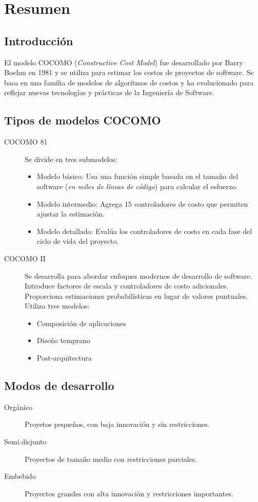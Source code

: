 \section*{Resumen}

\subsection*{Introducci\'on}
\noindent El modelo COCOMO (\textit{Constructive Cost Model}) fue desarrollado por Barry Boehm en 1981 y se utiliza para estimar los costos
de proyectos de software. Se basa en una familia de modelos de algoritmos de costos y ha evolucionado para reflejar nuevas tecnolog\'ias y
pr\'acticas de la Ingenier\'ia de Software.

\subsection*{Tipos de modelos COCOMO}
\begin{description}
  \item[COCOMO 81] Se divide en tres submodelos:
  \begin{itemize}
    \item Modelo b\'asico: Usa una funci\'on simple basada en el tamaño del software (\textit{en miles de l\'ineas de c\'odigo}) para calcular
    el esfuerzo.
    \item Modelo intermedio: Agrega 15 controladores de costo que permiten ajustar la estimaci\'on.
    \item Modelo detallado: Eval\'ua los controladores de costo en cada fase del ciclo de vida del proyecto.
  \end{itemize} 
  
  \item[COCOMO II] Se desarrolla para abordar enfoques modernos de desarrollo de software. Introduce factores de escala y controladores de
  costo adicionales. Proporciona estimaciones probabil\'isticas en lugar de valores puntuales. Utiliza tres modelos:
  \begin{itemize}
    \item Composici\'on de aplicaciones
    \item Diseño temprano
    \item Post-arquitectura
  \end{itemize}
\end{description}

\subsection*{Modos de desarrollo}
\begin{description}
  \item[Org\'anico] Proyetos pequeños, con baja innovaci\'on y sin restricciones.
  \item[Semi.disjunto] Proyectos de tamaño medio con restricciones parciales.
  \item[Embebido] Proyectos grandes con alta innovaci\'on y restricciones importantes.  
\end{description}


